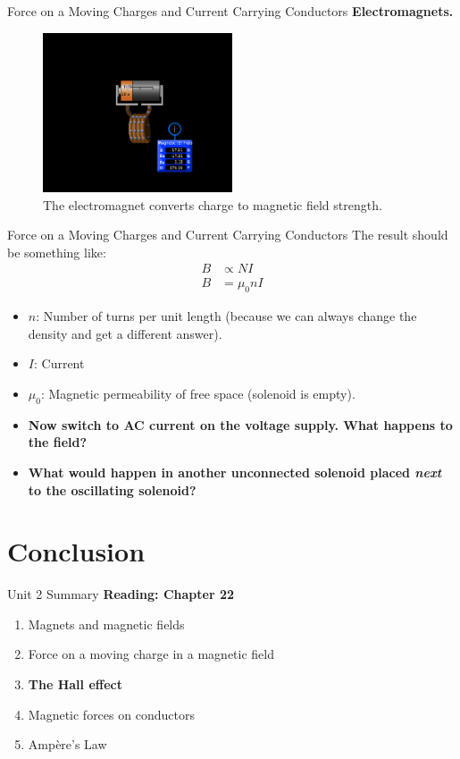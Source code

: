 \documentclass{beamer}
\begin{document}
\begin{frame}{Force on a Moving Charges and Current Carrying Conductors}
\textbf{Electromagnets.}
\begin{figure}
\centering
\includegraphics[width=0.5\textwidth]{figures/phetemmag.png}
\caption{\label{fig:phetemmag} The electromagnet converts charge to magnetic field strength.}
\end{figure}
\end{frame}

\begin{frame}{Force on a Moving Charges and Current Carrying Conductors}
The result should be something like:
\begin{align}
B &\propto N I \\
B &= \mu_0 n I
\end{align}
\begin{itemize}
\item $n$: Number of turns per unit length (because we can always change the density and get a different answer).
\item $I$: Current
\item $\mu_0$: Magnetic permeability of free space (solenoid is empty).
\item \textbf{Now switch to AC current on the voltage supply.  What happens to the field?}
\item \textbf{What would happen in another unconnected solenoid placed \textit{next} to the oscillating solenoid?}
\end{itemize}
\end{frame}

\section{Conclusion}

\begin{frame}{Unit 2 Summary}
\textbf{Reading: Chapter 22}
\begin{enumerate}
\item Magnets and magnetic fields
\item Force on a moving charge in a magnetic field
\item \textbf{The Hall effect}
\item Magnetic forces on conductors
\item \alert{Amp\`{e}re's Law}
\end{enumerate}
\end{frame}
\end{document}
